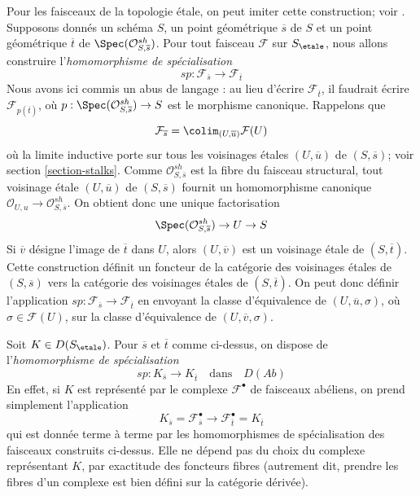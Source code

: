 \medskip\noindent
Pour les faisceaux de la topologie étale, on peut imiter cette construction; voir
\cite[Expos\'e VIII, 7.7, page 397]{SGA4}. Supposons donnés
un schéma $S$, un point géométrique $\overline{s}$ de $S$ et un point
géométrique $\overline{t}$ de $\Spec(\mathcal{O}^{sh}_{S, \overline{s}})$.
Pour tout faisceau $\mathcal{F}$ sur $S_\etale$, nous allons construire
l'{\it homomorphisme de spécialisation}
$$
sp : \mathcal{F}_{\overline{s}} \longrightarrow \mathcal{F}_{\overline{t}}
$$
Nous avons ici commis un abus de langage : au lieu d'écrire
$\mathcal{F}_{\overline{t}}$, il faudrait écrire $\mathcal{F}_{p(\overline{t})}$,
où $p : \Spec(\mathcal{O}^{sh}_{S, \overline{s}}) \to S$ est le morphisme
canonique. Rappelons que
$$
\mathcal{F}_{\overline{s}} = \colim_{(U, \overline{u})} \mathcal{F}(U)
$$
où la limite inductive porte sur tous les voisinages étales $(U, \overline{u})$
de $(S, \overline{s})$; voir section \ref{section-stalks}. Comme
$\mathcal{O}^{sh}_{S, \overline{s}}$ est la fibre du
faisceau structural, tout voisinage étale
$(U, \overline{u})$ de $(S, \overline{s})$ fournit un homomorphisme canonique
$\mathcal{O}_{U, u} \to \mathcal{O}^{sh}_{S, \overline{s}}$.
On obtient donc une unique factorisation
$$
\Spec(\mathcal{O}^{sh}_{S, \overline{s}}) \to U \to S
$$
Si $\overline{v}$ désigne l'image de $\overline{t}$ dans $U$, alors
$(U, \overline{v})$ est un voisinage étale de $(S, \overline{t})$.
Cette construction définit un foncteur de la catégorie des voisinages étales
de $(S, \overline{s})$ vers la catégorie des voisinages étales de
$(S, \overline{t})$. On peut donc définir l'application
$sp : \mathcal{F}_{\overline{s}} \to \mathcal{F}_{\overline{t}}$
en envoyant la classe d'équivalence de
$(U, \overline{u}, \sigma)$, où $\sigma \in \mathcal{F}(U)$,
sur la classe d'équivalence de $(U, \overline{v}, \sigma)$.

\medskip\noindent
Soit $K \in D(S_\etale)$. Pour $\overline{s}$ et $\overline{t}$
comme ci-dessus, on dispose de l'{\it homomorphisme de spécialisation}
$$
sp : K_{\overline{s}} \longrightarrow K_{\overline{t}}
\quad\text{dans}\quad D(\textit{Ab})
$$
En effet, si $K$ est représenté par le complexe $\mathcal{F}^\bullet$
de faisceaux abéliens, on prend simplement l'application
$$
K_{\overline{s}} = \mathcal{F}^\bullet_{\overline{s}}
\longrightarrow
\mathcal{F}^\bullet_{\overline{t}} = K_{\overline{t}}
$$
qui est donnée terme à terme par les homomorphismes de spécialisation des faisceaux
construits ci-dessus. Elle ne dépend pas du choix du complexe
représentant $K$, par exactitude des foncteurs fibres (autrement dit,
prendre les fibres d'un complexe est bien défini sur la catégorie dérivée).

